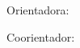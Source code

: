 \begin{center}
\makeatletter
	\@autorum

	\@autordois

	\@autortres

	\@autorquatro

\vspace*{8cm}

\MakeUppercase{\@titulo}\@subtitulo

\vspace{1cm}
    
\hfill \normalsize {\parbox{8cm}{\footnotesize\linespread{1}\selectfont\@nota
\vspace*{0.5cm}
    
Orientadora: \@orientador\par
Coorientador: \@coorientador}}
\vfill

\@local\\
\data
\makeatother
\end{center}